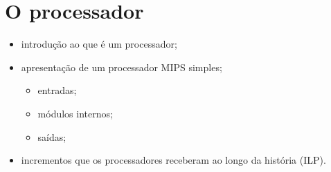 \section{O processador}

	\label{sec:processor}

    \begin{itemize}
        \item introdução ao que é um processador;
        \item apresentação de um processador MIPS simples;
        \begin{itemize}
            \item entradas;
            \item módulos internos;
            \item saídas;
        \end{itemize}
        \item incrementos que os processadores receberam ao longo da 
        história (ILP).
    \end{itemize}